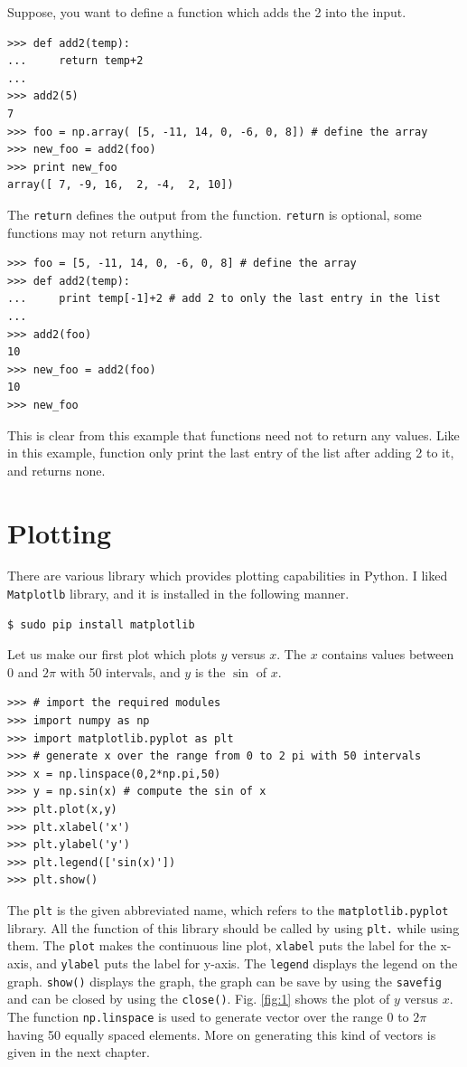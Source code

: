 \documentclass[10pt]{book}
\begin{document}
{Suppose, you want to define a function which adds the 2 into the input.
\beforeverb
\begin{verbatim}
>>> def add2(temp):
...     return temp+2
... 
>>> add2(5)
7
>>> foo = np.array( [5, -11, 14, 0, -6, 0, 8]) # define the array
>>> new_foo = add2(foo)
>>> print new_foo
array([ 7, -9, 16,  2, -4,  2, 10])
\end{verbatim}
\afterverb
The \verb"return" defines the output from the function. \verb"return" is optional, some functions may not return anything.

\beforeverb
\begin{verbatim}
>>> foo = [5, -11, 14, 0, -6, 0, 8] # define the array
>>> def add2(temp):
...     print temp[-1]+2 # add 2 to only the last entry in the list
... 
>>> add2(foo)
10
>>> new_foo = add2(foo)
10
>>> new_foo
\end{verbatim}
\afterverb
This is clear from this example that functions need not to return any values. Like in this example, function only print the last entry of the list after adding 2 to it, and returns none.

\section{Plotting}
There are various library which provides plotting capabilities in Python. I liked \verb"Matplotlb" library, and it is installed in the following manner.
\beforeverb
\begin{verbatim}
$ sudo pip install matplotlib
\end{verbatim}
\afterverb

Let us make our first plot which plots $y$ versus $x$. The $x$ contains values between $0$ and $2 \pi$ with 50 intervals, and $y$ is the $\sin$ of $x$.

\beforeverb
\begin{verbatim}
>>> # import the required modules
>>> import numpy as np
>>> import matplotlib.pyplot as plt
>>> # generate x over the range from 0 to 2 pi with 50 intervals
>>> x = np.linspace(0,2*np.pi,50)
>>> y = np.sin(x) # compute the sin of x
>>> plt.plot(x,y)
>>> plt.xlabel('x')
>>> plt.ylabel('y')
>>> plt.legend(['sin(x)'])
>>> plt.show()
\end{verbatim}
\afterverb
{}

The \verb"plt" is the given abbreviated name, which refers to the \verb"matplotlib.pyplot" library. All the function of this library should be called by using \verb"plt." while using them. The \verb"plot" makes the continuous line plot, \verb"xlabel" puts the label for the x-axis, and \verb"ylabel" puts the label for y-axis. The \verb"legend" displays the legend on the graph. \verb"show()" displays the graph, the graph can be save by using the \verb"savefig" and can be closed by using the \verb"close()". Fig. \ref{fig:1} shows the plot of $y$ versus $x$. The function \verb"np.linspace" is used to generate vector over the range $0$ to $2 \pi$ having 50 equally spaced elements. More on generating this kind of vectors is given in the next chapter. 

}
\end{document}
